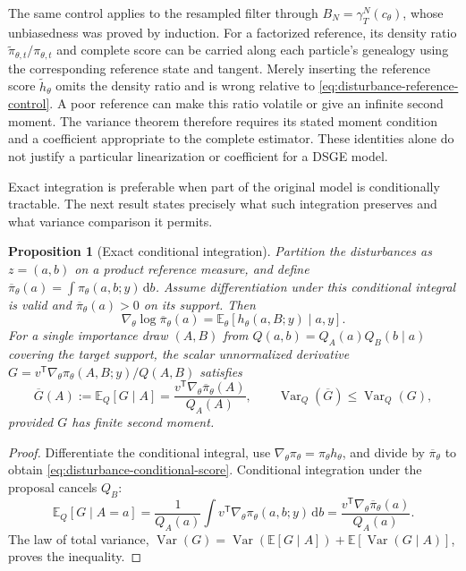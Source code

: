 \documentclass[11pt]{article}
\newtheorem{proposition}{Proposition}
\newcommand{\dd}{\mathrm{d}}
\begin{document}
The same control applies to the resampled filter through
$B_N=\gamma_T^N(c_\theta)$, whose unbiasedness was proved by induction.
For a factorized reference, its density ratio
$\widetilde\pi_{\theta,t}/\pi_{\theta,t}$ and complete score can be carried
along each particle's genealogy using the corresponding reference state
and tangent. Merely inserting the reference score
$\widetilde h_\theta$ omits the density ratio and is wrong relative to
\eqref{eq:disturbance-reference-control}. A poor reference can make this
ratio volatile or give an infinite second moment. The variance theorem
therefore requires its stated moment condition and a coefficient appropriate
to the complete estimator. These identities alone do not justify a
particular linearization or coefficient for a DSGE model.

Exact integration is preferable when part of the original model is
conditionally tractable. The next result states precisely what such
integration preserves and what variance comparison it permits.

\begin{proposition}[Exact conditional integration]
\label{prop:disturbance-marginalization}
Partition the disturbances as $z=(a,b)$ on a product reference measure, and
define
$\overline\pi_\theta(a)=\int\pi_\theta(a,b;y)\,\dd b$.
Assume differentiation under this conditional integral is valid and
$\overline\pi_\theta(a)>0$ on its support. Then
\begin{equation}
 \nabla_\theta\log\overline\pi_\theta(a)
 =\mathbb E_\theta[h_\theta(a,B;y)\mid a,y].
 \label{eq:disturbance-conditional-score}
\end{equation}
For a single importance draw $(A,B)$ from
$Q(a,b)=Q_A(a)Q_B(b\mid a)$ covering the target support, the scalar
unnormalized derivative $G=v^{\mathsf T}\nabla_\theta\pi_\theta(A,B;y)/
Q(A,B)$ satisfies
\begin{equation}
 \overline G(A):=\mathbb E_Q[G\mid A]
 =\frac{v^{\mathsf T}\nabla_\theta\overline\pi_\theta(A)}{Q_A(A)},
 \qquad
 \operatorname{Var}_Q(\overline G)\leq\operatorname{Var}_Q(G),
 \label{eq:disturbance-rao-blackwell}
\end{equation}
provided $G$ has finite second moment.
\end{proposition}

\begin{proof}
Differentiate the conditional integral, use
$\nabla_\theta\pi_\theta=\pi_\theta h_\theta$, and divide by
$\overline\pi_\theta$ to obtain
\eqref{eq:disturbance-conditional-score}. Conditional integration under the
proposal cancels $Q_B$:
\[
 \mathbb E_Q[G\mid A=a]
 =\frac1{Q_A(a)}
    \int v^{\mathsf T}\nabla_\theta\pi_\theta(a,b;y)\,\dd b
 =\frac{v^{\mathsf T}\nabla_\theta\overline\pi_\theta(a)}{Q_A(a)}.
\]
The law of total variance,
$\operatorname{Var}(G)=
\operatorname{Var}(\mathbb E[G\mid A])+
\mathbb E[\operatorname{Var}(G\mid A)]$, proves the inequality.
\end{proof}
\end{document}
